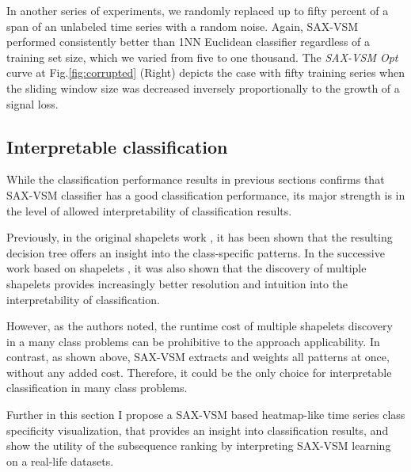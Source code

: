 In another series of experiments, we randomly replaced up to fifty percent of a span of an 
unlabeled time series with a random noise. 
Again, SAX-VSM performed consistently better than 1NN Euclidean classifier regardless of a 
training set size, which we varied from five to one thousand. 
The \textit{SAX-VSM Opt} curve at Fig.\ref{fig:corrupted} (Right) depicts the case
with fifty training series when the sliding window size was decreased inversely proportionally 
to the growth of a signal loss.

\subsection{Interpretable classification}
While the classification performance results in previous sections confirms that SAX-VSM 
classifier has a good classification performance, its major strength is in the level of allowed 
interpretability of classification results. 

Previously, in the original shapelets work \cite{citeulike:7344347, citeulike:11957982}, it has been shown 
that the resulting decision tree offers an insight into the class-specific patterns.
In the successive work based on shapelets \cite{citeulike:11345338}, it was also shown that the 
discovery of multiple shapelets provides increasingly better resolution and intuition into the interpretability 
of classification. 

However, as the authors noted, the runtime cost of multiple shapelets discovery in a many class problems 
can be prohibitive to the approach applicability. In contrast, as shown above, SAX-VSM extracts and weights 
all patterns at once, without any added cost. 
Therefore, it could be the only choice for interpretable classification in many class problems.

Further in this section I propose a SAX-VSM based heatmap-like time series class specificity visualization, 
that provides an insight into classification results, and show the utility of the subsequence ranking by interpreting 
SAX-VSM learning on a real-life datasets.

